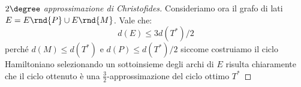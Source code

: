 \documentclass[\main/main.tex]{subfiles}
\begin{document}
\begin{multicols}{2}
\begin{proof}[\(2\degree\) approssimazione di Christofides]
    Consideriamo ora il grafo di lati \(E = E\rnd{P} \cup E\rnd{M}\). Vale che:
    \[
        d(E) \leq 3 d\left(T^{*}\right) / 2
    \]
    perché \(d(M) \leq d\left(T^{*}\right)\) e \(d(P) \leq d\left(T^{*}\right) / 2\) siccome costruiamo il ciclo Hamiltoniano selezionando un sottoinsieme degli archi di \(E\) risulta chiaramente che il ciclo ottenuto è una \(\frac{3}{2}\)-approssimazione del ciclo ottimo \(T^*\) 
\end{proof}
\end{multicols}
\end{document}
